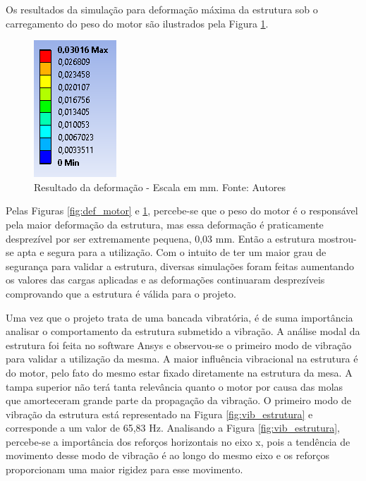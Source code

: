       Os resultados da simulação para deformação máxima da estrutura sob o carregamento do peso do motor são ilustrados pela Figura \ref{fig:result}.

  \begin{figure}[H]
      \centering
      \includegraphics[scale=0.7]{figuras/result.png}
      \caption{Resultado da deformação - Escala em mm. Fonte: Autores}
      \label{fig:result}
      \end{figure}

      Pelas Figuras \ref{fig:def_motor} e \ref{fig:result}, percebe-se que o peso do motor é o responsável pela maior deformação da estrutura, mas 
      essa deformação é praticamente desprezível por ser extremamente pequena, 0,03 mm. Então a estrutura mostrou-se apta e segura para a utilização.
    Com o intuito de ter um maior grau de segurança para validar a estrutura, diversas simulações foram feitas aumentando os valores das cargas aplicadas e as 
    deformações continuaram desprezíveis comprovando que a estrutura é válida para o projeto.

    \vfill
{}

    Uma vez que o projeto trata de uma bancada vibratória, é de suma importância analisar o comportamento da estrutura submetido a vibração. A análise modal da estrutura foi feita no software Ansys e observou-se o primeiro modo de vibração para validar a utilização da mesma.
    A maior influência vibracional na estrutura é do motor, pelo fato do mesmo estar fixado diretamente na estrutura da mesa. A tampa superior não terá tanta relevância quanto o motor por causa das molas que amorteceram grande parte da propagação da vibração.
    O primeiro modo de vibração da estrutura está representado na Figura \ref{fig:vib_estrutura} e corresponde a um valor de 65,83 Hz.
    Analisando a Figura \ref{fig:vib_estrutura}, percebe-se a importância dos reforços horizontais no eixo x, pois a tendência de movimento 
    desse modo de vibração é ao longo do mesmo eixo e os reforços proporcionam uma maior rigidez para esse movimento.

